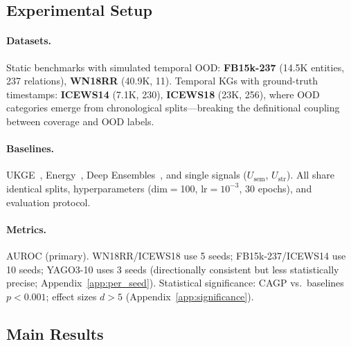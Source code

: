 
\subsection{Experimental Setup}

\paragraph{Datasets.}
Static benchmarks with simulated temporal OOD: \textbf{FB15k-237} (14.5K entities, 237 relations), \textbf{WN18RR} (40.9K, 11). Temporal KGs with ground-truth timestamps: \textbf{ICEWS14} (7.1K, 230), \textbf{ICEWS18} (23K, 256), where OOD categories emerge from chronological splits---breaking the definitional coupling between coverage and OOD labels.

\paragraph{Baselines.}
UKGE~\citep{chen2019embedding}, Energy~\citep{liu2020energy}, Deep Ensembles~\citep{lakshminarayanan2017simple}, and single signals ($U_{\text{sem}}$, $U_{\text{str}}$). All share identical splits, hyperparameters (dim$=$100, lr$=10^{-3}$, 30 epochs), and evaluation protocol.

\paragraph{Metrics.}
AUROC (primary). WN18RR/ICEWS18 use 5 seeds; FB15k-237/ICEWS14 use 10 seeds; YAGO3-10 uses 3 seeds (directionally consistent but less statistically precise; Appendix~\ref{app:per_seed}). Statistical significance: CAGP vs.\ baselines $p < 0.001$; effect sizes $d > 5$ (Appendix~\ref{app:significance}).

\subsection{Main Results}

